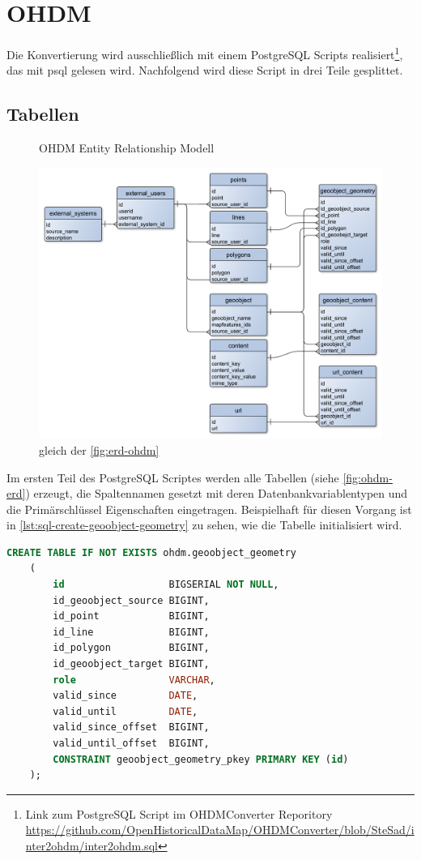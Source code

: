 \chapter{OHDM}
Die Konvertierung wird ausschließlich mit einem PostgreSQL Scripts realisiert\footnote{Link zum PostgreSQL Script im OHDMConverter Reporitory\\ \url{https://github.com/OpenHistoricalDataMap/OHDMConverter/blob/SteSad/inter2ohdm/inter2ohdm.sql}}, das mit psql\cite{postgres-psql} gelesen wird. Nachfolgend wird diese Script in drei Teile gesplittet.

\section{Tabellen}
\begin{figure}[h]
	\caption{OHDM Entity Relationship Modell}
	\label{fig:ohdm-erd}
	\includegraphics[width=\linewidth]{img/ohdm-db-erd.pdf}
	\caption*{gleich der \autoref{fig:erd-ohdm}}
\end{figure}

Im ersten Teil des PostgreSQL Scriptes werden alle Tabellen (siehe \autoref{fig:ohdm-erd}) erzeugt, die Spaltennamen gesetzt mit deren Datenbankvariablentypen und die Primärschlüssel Eigenschaften eingetragen. Beispielhaft für diesen Vorgang ist in \autoref{lst:sql-create-geoobject-geometry} zu sehen, wie die Tabelle  initialisiert wird.\newpage

\begin{lstlisting}[language=SQL,caption={Erzeugung der \gequote{geoobject\_geometry} Tabelle},label={lst:sql-create-geoobject-geometry}]
	CREATE TABLE IF NOT EXISTS ohdm.geoobject_geometry
	(
		id                  BIGSERIAL NOT NULL,
		id_geoobject_source BIGINT,
		id_point            BIGINT,
		id_line             BIGINT,
		id_polygon          BIGINT,
		id_geoobject_target BIGINT,
		role                VARCHAR,
		valid_since         DATE,
		valid_until         DATE,
		valid_since_offset  BIGINT,
		valid_until_offset  BIGINT,
		CONSTRAINT geoobject_geometry_pkey PRIMARY KEY (id)
	);
\end{lstlisting}


